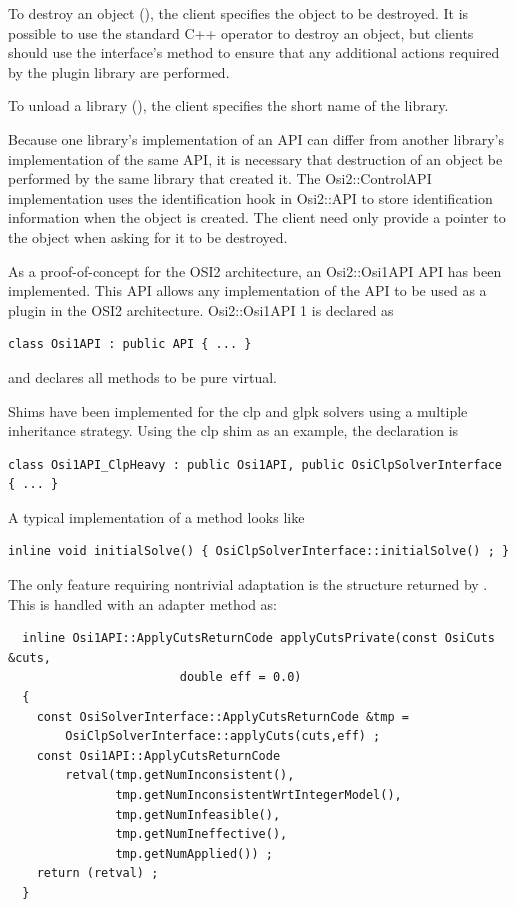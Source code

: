 \documentclass{article}
\newcommand{\OsiTwo}{OSI2\xspace}
\newcommand{\OsiTwoTop}{Osi2::API\xspace}
\newcommand{\OsiTwoControl}{Osi2::ControlAPI\xspace}
\newcommand{\OsiTwoOsi}{Osi2::Osi1API\xspace}
\begin{document}
To destroy an object (),
the client specifies the object to be destroyed.
It is possible to use the standard C++  operator to destroy an
object, but clients should use the interface's  method
to ensure that any additional actions required by the plugin library are
performed.

To unload a library (), the client specifies the short name
of the library.

Because one library's implementation of an API can differ from another
library's implementation of the same API, it is necessary that destruction of
an object be performed by the same library that created it.
The \OsiTwoControl implementation uses the identification hook in \OsiTwoTop to
store identification information when the object is created.
The client need only provide a pointer to the object when asking for it to be
destroyed.

\subheading[l]{\OsiTwoOsi}

As a proof-of-concept for the \OsiTwo architecture, an \OsiTwoOsi API has been
implemented.
This API allows any implementation of the  API to
be used as a plugin in the \OsiTwo architecture.
\OsiTwoOsi1 is declared as
\begin{verbatim}
class Osi1API : public API { ... }
\end{verbatim}
and declares all  methods to be pure virtual.

Shims have been implemented for the clp and glpk solvers using a multiple
inheritance strategy.
Using the clp shim as an example, the declaration is
\begin{verbatim}
class Osi1API_ClpHeavy : public Osi1API, public OsiClpSolverInterface { ... }
\end{verbatim}
A typical implementation of a method looks like
\begin{verbatim}
inline void initialSolve() { OsiClpSolverInterface::initialSolve() ; }
\end{verbatim}
The only feature requiring nontrivial adaptation is the
 structure returned by .
This is handled with an adapter method as:
\begin{verbatim}
  inline Osi1API::ApplyCutsReturnCode applyCutsPrivate(const OsiCuts &cuts,
  						double eff = 0.0)
  { 
    const OsiSolverInterface::ApplyCutsReturnCode &tmp =
        OsiClpSolverInterface::applyCuts(cuts,eff) ;
    const Osi1API::ApplyCutsReturnCode
        retval(tmp.getNumInconsistent(),
               tmp.getNumInconsistentWrtIntegerModel(),
               tmp.getNumInfeasible(),
               tmp.getNumIneffective(),
               tmp.getNumApplied()) ;
    return (retval) ;
  }
\end{verbatim}
\end{document}
